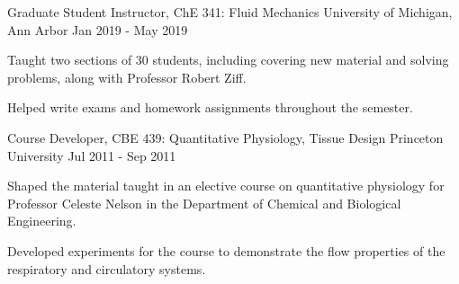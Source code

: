 \begin{cventries}
  \cventry
    {Graduate Student Instructor, ChE 341: Fluid Mechanics} %
    {University of Michigan, Ann Arbor} %
    {} %
    {Jan 2019 - May 2019} %
    {
      \begin{cvitems} %
        \item Taught two sections of 30 students, including covering new material and solving problems, along with Professor Robert Ziff.
        \item Helped write exams and homework assignments throughout the semester.
      \end{cvitems}
    }
  \cventry
    {Course Developer, CBE 439: Quantitative Physiology, Tissue Design} %
    {Princeton University} %
    {} %
    {Jul 2011 - Sep 2011} %
    {
      \begin{cvitems} %
        \item Shaped the material taught in an elective course on quantitative physiology for Professor Celeste Nelson in the Department of Chemical and Biological Engineering.
        \item Developed experiments for the course to demonstrate the flow properties of the respiratory and circulatory systems.
      \end{cvitems}
    }
\end{cventries}
